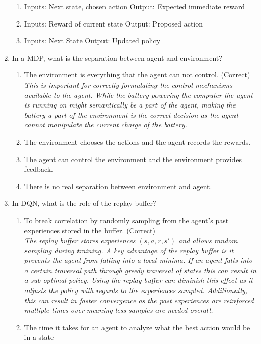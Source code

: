 \documentclass{exam}
\begin{document}
\begin{enumerate}
\begin{enumerate}
            \item Inputs: Next state, chosen action Output: Expected immediate reward
            \item Inputs: Reward of current state Output: Proposed action
            \item Inputs: Next State Output: Updated policy
        \end{enumerate}
    \item In a MDP, what is the separation between agent and environment?
        \begin{enumerate}
            \item The environment is everything that the agent can not control. (Correct)\\
                \textit{This is important for correctly formulating the control mechanisms available to the agent. While the battery powering the computer the agent is running on might semantically be a part of the agent, making the battery a part of the environment is the correct decision as the agent cannot manipulate the current charge of the battery.}
            \item The environment chooses the actions and the agent records the rewards.
            \item The agent can control the environment and the environment provides feedback.
            \item There is no real separation between environment and agent.
        \end{enumerate}
    \item In DQN, what is the role of the replay buffer?
        \begin{enumerate}
            \item To break correlation by randomly sampling from the agent's past experiences stored in the buffer. (Correct)\\
            \textit{The replay buffer stores experiences $(s, a, r, s')$ and allows random sampling during training. A key advantage of the replay buffer is it prevents the agent from falling into a local minima. If an agent falls into a certain traversal path through greedy traversal of states this can result in a sub-optimal policy. Using the replay buffer can diminish this effect as it adjusts the policy with regards to the experiences sampled. Additionally, this can result in faster convergence as the past experiences are reinforced multiple times over meaning less samples are needed overall.}
            \item The time it takes for an agent to analyze what the best action would be in a state

\end{enumerate}
\end{enumerate}
\end{document}
